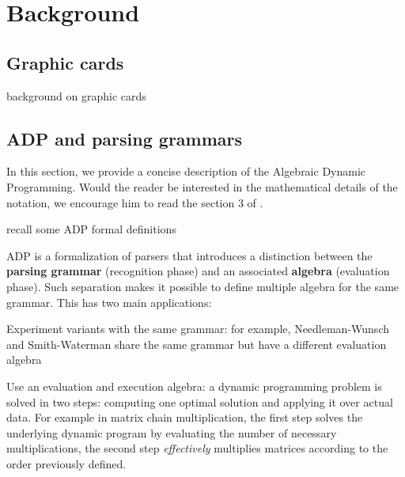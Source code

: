 \newpage
\section{Background} \label{background}
\subsection{Graphic cards}
{\color{red} background on graphic cards}

\subsection{ADP and parsing grammars} \label{adp_grammar}
In this section, we provide a concise description of the Algebraic Dynamic Programming. Would the reader be interested in the mathematical details of the notation, we encourage him to read the section 3 of \cite{adp}.

{\color{red} recall some ADP formal definitions}


ADP is a formalization of parsers that introduces a distinction between the \textbf{parsing grammar} (recognition phase) and an associated \textbf{algebra} (evaluation phase). Such separation makes it possible to define multiple algebra for the same grammar. This has two main applications:\ol
\item Experiment variants with the same grammar:  for example, Needleman-Wunsch and Smith-Waterman share the same grammar but have a different evaluation algebra
\item Use an evaluation and execution algebra: a dynamic programming problem is solved in two steps: computing one optimal solution and applying it over actual data. For example in matrix chain multiplication, the first step solves the underlying dynamic program by evaluating the number of necessary multiplications, the second step \textit{effectively} multiplies matrices according to the order previously defined.
\ole

